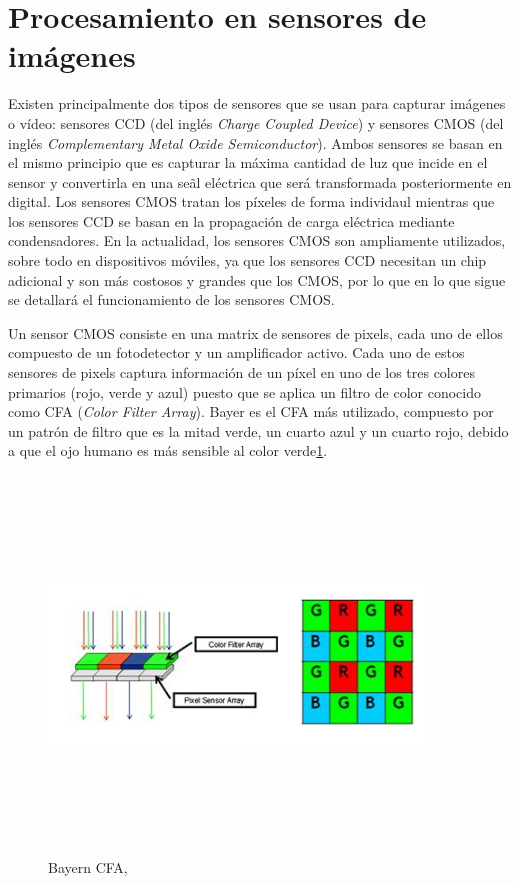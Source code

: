 \section{Procesamiento en sensores de imágenes} 
Existen principalmente dos tipos de sensores que se usan para capturar imágenes o vídeo: sensores CCD (del inglés \textit{Charge Coupled Device}) y sensores CMOS (del inglés \textit{Complementary Metal Oxide Semiconductor}). Ambos sensores se basan en el mismo principio que es capturar la máxima cantidad de luz que incide en el sensor y convertirla en una se\~al eléctrica que será transformada posteriormente en digital. Los sensores CMOS tratan los píxeles de forma individaul mientras que los sensores CCD se basan en la propagación de carga eléctrica mediante condensadores. En la actualidad, los sensores CMOS son ampliamente utilizados, sobre todo en dispositivos móviles, ya que los sensores CCD necesitan un chip adicional y son más costosos y grandes que los CMOS, por lo que en lo que sigue se detallará el funcionamiento de los sensores CMOS\cite{villalba:2015}. 

Un sensor CMOS consiste en una matrix de sensores de pixels, cada uno de ellos compuesto de un fotodetector y un amplificador activo. Cada uno de estos sensores de pixels captura información de un píxel en uno de los tres colores primarios (rojo, verde y azul) puesto que se aplica un filtro de color conocido como CFA (\textit{Color Filter Array}). Bayer es el CFA más utilizado, compuesto por un patrón de filtro que es la mitad verde, un cuarto azul y un cuarto rojo, debido a que el ojo humano es más sensible al color verde\ref{fig_cfa}\cite{b3:2012}. \\ 

\begin{figure}[ht!]
\begin{center}
\includegraphics[width=10cm,height=10cm,keepaspectratio]{figuras/cfa.png}
\end{center}
\caption{Bayern CFA, \cite{b3:2012}}
\label{fig_cfa}
\end{figure}

